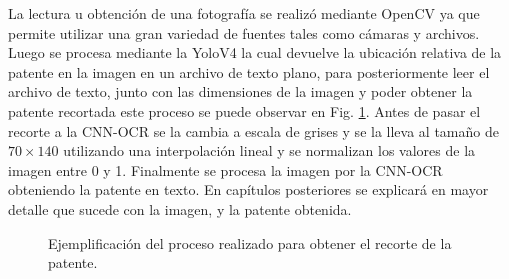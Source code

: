 La lectura u obtención de una fotografía se realizó mediante OpenCV \cite{opencv_opencv_2023} ya que permite utilizar una gran variedad de fuentes tales como cámaras y archivos. Luego se procesa mediante la YoloV4 la cual devuelve la ubicación relativa de la patente en la imagen en un archivo de texto plano, para posteriormente leer el archivo de texto, junto con las dimensiones de la imagen y poder obtener la patente recortada este proceso se puede observar en Fig. \ref{fig:yolo-car-to-plate}. Antes de pasar el recorte a la CNN-OCR se la cambia a escala de grises y se la lleva al tamaño de $70 \times 140$ utilizando una interpolación lineal y se normalizan los valores de la imagen entre 0 y 1. Finalmente se procesa la imagen por la CNN-OCR obteniendo la patente en texto. En capítulos posteriores se explicará en mayor detalle que sucede con la imagen, y la patente obtenida.

\begin{figure}
    \centering

    \caption{Ejemplificación del proceso realizado para obtener el recorte de la patente.}
    \label{fig:yolo-car-to-plate}
\end{figure}








